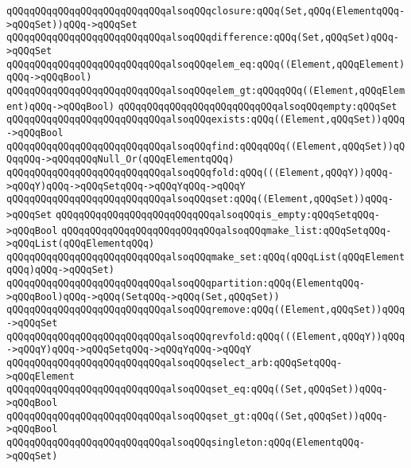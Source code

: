 \verb|qQQqqQQqqQQqqQQqqQQqqQQqqQQqalsoqQQqclosure:qQQq(Set,qQQq(ElementqQQq->qQQqSet))qQQq->qQQqSet|\newline
\verb|qQQqqQQqqQQqqQQqqQQqqQQqqQQqalsoqQQqdifference:qQQq(Set,qQQqSet)qQQq->qQQqSet|\newline
\verb|qQQqqQQqqQQqqQQqqQQqqQQqqQQqalsoqQQqelem_eq:qQQq((Element,qQQqElement)qQQq->qQQqBool)|\newline
\verb|qQQqqQQqqQQqqQQqqQQqqQQqqQQqalsoqQQqelem_gt:qQQqqQQq((Element,qQQqElement)qQQq->qQQqBool)|\newline
\verb|qQQqqQQqqQQqqQQqqQQqqQQqqQQqalsoqQQqempty:qQQqSet|\newline
\verb|qQQqqQQqqQQqqQQqqQQqqQQqqQQqalsoqQQqexists:qQQq((Element,qQQqSet))qQQq->qQQqBool|\newline
\verb|qQQqqQQqqQQqqQQqqQQqqQQqqQQqalsoqQQqfind:qQQqqQQq((Element,qQQqSet))qQQqqQQq->qQQqqQQqNull_Or(qQQqElementqQQq)|\newline
\verb|qQQqqQQqqQQqqQQqqQQqqQQqqQQqalsoqQQqfold:qQQq(((Element,qQQqY))qQQq->qQQqY)qQQq->qQQqSetqQQq->qQQqYqQQq->qQQqY|\newline
\verb|qQQqqQQqqQQqqQQqqQQqqQQqqQQqalsoqQQqset:qQQq((Element,qQQqSet))qQQq->qQQqSet|\newline
\verb|qQQqqQQqqQQqqQQqqQQqqQQqqQQqalsoqQQqis_empty:qQQqSetqQQq->qQQqBool|\newline
\verb|qQQqqQQqqQQqqQQqqQQqqQQqqQQqalsoqQQqmake_list:qQQqSetqQQq->qQQqList(qQQqElementqQQq)|\newline
\verb|qQQqqQQqqQQqqQQqqQQqqQQqqQQqalsoqQQqmake_set:qQQq(qQQqList(qQQqElementqQQq)qQQq->qQQqSet)|\newline
\verb|qQQqqQQqqQQqqQQqqQQqqQQqqQQqalsoqQQqpartition:qQQq(ElementqQQq->qQQqBool)qQQq->qQQq(SetqQQq->qQQq(Set,qQQqSet))|\newline
\verb|qQQqqQQqqQQqqQQqqQQqqQQqqQQqalsoqQQqremove:qQQq((Element,qQQqSet))qQQq->qQQqSet|\newline
\verb|qQQqqQQqqQQqqQQqqQQqqQQqqQQqalsoqQQqrevfold:qQQq(((Element,qQQqY))qQQq->qQQqY)qQQq->qQQqSetqQQq->qQQqYqQQq->qQQqY|\newline
\verb|qQQqqQQqqQQqqQQqqQQqqQQqqQQqalsoqQQqselect_arb:qQQqSetqQQq->qQQqElement|\newline
\verb|qQQqqQQqqQQqqQQqqQQqqQQqqQQqalsoqQQqset_eq:qQQq((Set,qQQqSet))qQQq->qQQqBool|\newline
\verb|qQQqqQQqqQQqqQQqqQQqqQQqqQQqalsoqQQqset_gt:qQQq((Set,qQQqSet))qQQq->qQQqBool|\newline
\verb|qQQqqQQqqQQqqQQqqQQqqQQqqQQqalsoqQQqsingleton:qQQq(ElementqQQq->qQQqSet)|\newline

